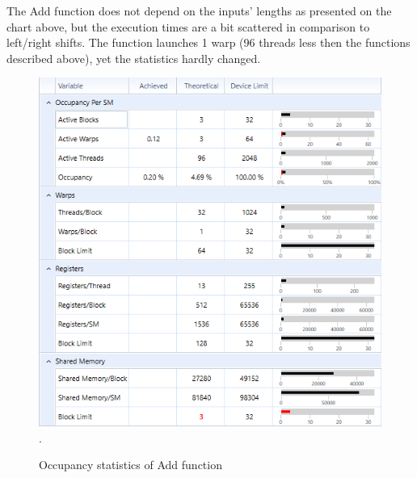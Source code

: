 \documentclass[oneside,openright,12pt,final,en]{mgr}
\begin{document}
The Add function does not depend on the inputs' lengths as presented on the chart above, but the execution times are a bit scattered in comparison to left/right shifts.
The function launches 1 warp (96 threads less then the functions described above), yet the statistics hardly changed.

\begin{figure}[H]
	\centering
	\includegraphics[width=\textwidth]{add_occupancy}.
	\caption{Occupancy statistics of Add function}
	\label{fig:add_occupancy}
\end{figure}
\end{document}
